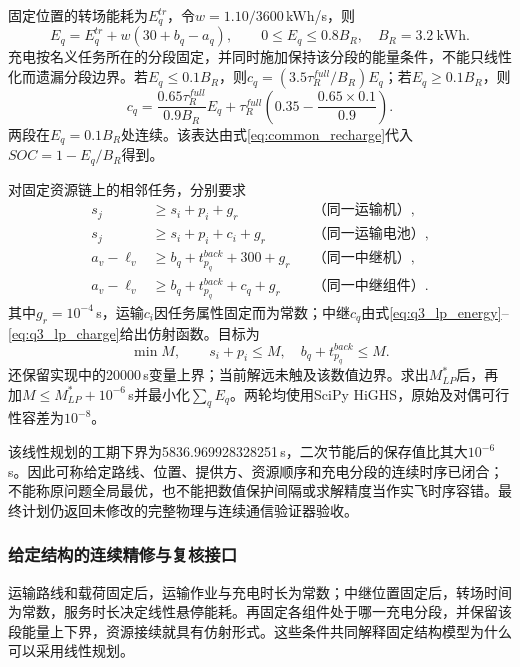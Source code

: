 \documentclass[withoutpreface,colorprint]{format}
\numberwithin{equation}{section}
\numberwithin{figure}{section}
\numberwithin{table}{section}
\begin{document}
固定位置的转场能耗为$E_q^{tr}$，令$w=1.10/3600$\,kWh/s，则
\begin{equation}
 E_q=E_q^{tr}+w(30+b_q-a_q),\qquad 0\le E_q\le0.8B_R,
 \quad B_R=3.2\ \mathrm{kWh}.
 \label{eq:q3_lp_energy}
\end{equation}
充电按名义任务所在的分段固定，并同时施加保持该分段的能量条件，不能只线性化而遗漏分段边界。若$E_q\le0.1B_R$，则$c_q=(3.5\tau_R^{full}/B_R)E_q$；若$E_q\ge0.1B_R$，则
\begin{equation}
 c_q=\frac{0.65\tau_R^{full}}{0.9B_R}E_q
       +\tau_R^{full}\left(0.35-\frac{0.65\times0.1}{0.9}\right).
 \label{eq:q3_lp_charge}
\end{equation}
两段在$E_q=0.1B_R$处连续。该表达由式\eqref{eq:common_recharge}代入$SOC=1-E_q/B_R$得到。

对固定资源链上的相邻任务，分别要求
\begin{equation}
\begin{aligned}
 s_j&\ge s_i+p_i+g_r &&\text{（同一运输机）},\\
 s_j&\ge s_i+p_i+c_i+g_r &&\text{（同一运输电池）},\\
 a_v-\ell_v&\ge b_q+t_{p_q}^{back}+300+g_r &&\text{（同一中继机）},\\
 a_v-\ell_v&\ge b_q+t_{p_q}^{back}+c_q+g_r &&\text{（同一中继组件）}.
\end{aligned}
\label{eq:q3_lp_resource}
\end{equation}
其中$g_r=10^{-4}$\,s，运输$c_i$因任务属性固定而为常数；中继$c_q$由式\eqref{eq:q3_lp_energy}--\eqref{eq:q3_lp_charge}给出仿射函数。目标为
\begin{equation}
 \min M,\qquad s_i+p_i\le M,\quad b_q+t_{p_q}^{back}\le M .
 \label{eq:q3_lp_objective}
\end{equation}
还保留实现中的20000\,s变量上界；当前解远未触及该数值边界。求出$M_{LP}^*$后，再加$M\le M_{LP}^*+10^{-6}$\,s并最小化$\sum_q E_q$。两轮均使用SciPy HiGHS，原始及对偶可行性容差为$10^{-8}$。

该线性规划的工期下界为5836.969928328251\,s，二次节能后的保存值比其大$10^{-6}$\,s。因此可称给定路线、位置、提供方、资源顺序和充电分段的连续时序已闭合；不能称原问题全局最优，也不能把数值保护间隔或求解精度当作实飞时序容错。最终计划仍返回未修改的完整物理与连续通信验证器验收。



\subsubsection{给定结构的连续精修与复核接口}
运输路线和载荷固定后，运输作业与充电时长为常数；中继位置固定后，转场时间为常数，服务时长决定线性悬停能耗。再固定各组件处于哪一充电分段，并保留该段能量上下界，资源接续就具有仿射形式。这些条件共同解释固定结构模型为什么可以采用线性规划。
\end{document}
